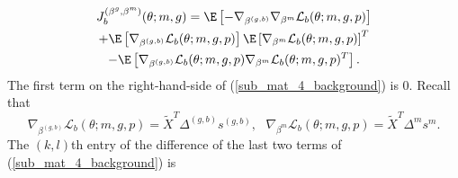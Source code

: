 \documentclass[12pt]{article}
\begin{document}
\begin{multline}\label{sub_mat_4_background}
J_b^{(\beta^g, \beta^m)}(\theta; m,g) = \E \left[-\nabla_{\beta^{(g,b)}} \nabla_{\beta^m} \mathcal{L}_b(\theta; m, g, p) \right] \\ + \E\left[ \nabla_{\beta^{(g,b)}}\mathcal{L}_b(\theta ; m,g,p) \right] \E \left[\nabla_{\beta^m}\mathcal{L}_b (\theta ; m,g,p)  \right]^T \\ - \E \left[ \nabla_{\beta^{(g,b)}}\mathcal{L}_b (\theta; m,g,p) \nabla_{\beta^m}\mathcal{L}_b(\theta; m,g,p)^T  \right].
\end{multline} The first term on the right-hand-side of (\ref{sub_mat_4_background}) is $0$. Recall that $$\nabla_{\beta^{(g,b)}} \mathcal{L}_b(\theta; m, g, p) =   \tilde{X}^T\Delta^{(g,b)} s^{(g,b)}, \textrm{		} \nabla_{\beta^m} \mathcal{L}_b(\theta; m, g, p) = \tilde{X}^T \Delta^m s^m.$$ The $(k,l)$th entry of the difference of the last two terms of (\ref{sub_mat_4_background}) is
\end{document}
